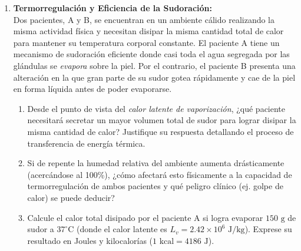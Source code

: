 \documentclass[10pt,letterpaper]{article}
\begin{document}
\begin{enumerate}[leftmargin=*]

    \item \textbf{Termorregulación y Eficiencia de la Sudoración:}\\
    Dos pacientes, A y B, se encuentran en un ambiente cálido realizando la misma actividad física y necesitan disipar la misma cantidad total de calor para mantener su temperatura corporal constante. El paciente A tiene un mecanismo de sudoración eficiente donde casi toda el agua segregada por las glándulas se \textit{evapora} sobre la piel. Por el contrario, el paciente B presenta una alteración en la que gran parte de su sudor gotea rápidamente y cae de la piel en forma líquida antes de poder evaporarse.
    \begin{enumerate}
        \item Desde el punto de vista del \textit{calor latente de vaporización}, ¿qué paciente necesitará secretar un mayor volumen total de sudor para lograr disipar la misma cantidad de calor? Justifique su respuesta detallando el proceso de transferencia de energía térmica.
        \item Si de repente la humedad relativa del ambiente aumenta drásticamente (acercándose al 100\%), ¿cómo afectará esto físicamente a la capacidad de termorregulación de ambos pacientes y qué peligro clínico (ej. golpe de calor) se puede deducir?
        \item Calcule el calor total disipado por el paciente A si logra evaporar $150 \text{ g}$ de sudor a $37^\circ\text{C}$ (donde el calor latente es $L_v = 2.42 \times 10^6 \text{ J/kg}$). Exprese su resultado en Joules y kilocalorías ($1 \text{ kcal} = 4186 \text{ J}$).
    \end{enumerate}

    \vspace{0.1cm}


\end{enumerate}
\end{document}
